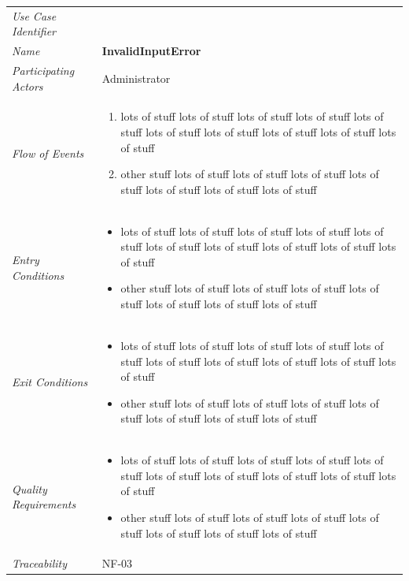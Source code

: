 \documentclass[12pt,letterpaper]{article}
\begin{document}
\begin{center}
	\begin{tabu} to 
		\toprule
		Use Case Identifier & \invalidinputerror{} \\
		Name & {\bf InvalidInputError} \\
		Participating Actors & Administrator \\
		Flow of Events & 
	    \begin{enumerate}[topsep=-1em]
		    \item lots of stuff lots of stuff lots of stuff lots of stuff lots of stuff lots of stuff lots of stuff lots of stuff lots of stuff lots of stuff
		    \item other stuff lots of stuff lots of stuff lots of stuff lots of stuff lots of stuff lots of stuff lots of stuff
		\end{enumerate} \\

		Entry Conditions &
		\begin{itemize}[topsep=-1em]
		    \item lots of stuff lots of stuff lots of stuff lots of stuff lots of stuff lots of stuff lots of stuff lots of stuff lots of stuff lots of stuff
		    \item other stuff lots of stuff lots of stuff lots of stuff lots of stuff lots of stuff lots of stuff lots of stuff
        \end{itemize} \\

		Exit Conditions &
		\begin{itemize}[topsep=-1em]
		    \item lots of stuff lots of stuff lots of stuff lots of stuff lots of stuff lots of stuff lots of stuff lots of stuff lots of stuff lots of stuff
		    \item other stuff lots of stuff lots of stuff lots of stuff lots of stuff lots of stuff lots of stuff lots of stuff
        \end{itemize} \\

		Quality Requirements &
		\begin{itemize}[topsep=-1em]
		    \item lots of stuff lots of stuff lots of stuff lots of stuff lots of stuff lots of stuff lots of stuff lots of stuff lots of stuff lots of stuff
		    \item other stuff lots of stuff lots of stuff lots of stuff lots of stuff lots of stuff lots of stuff lots of stuff
        \end{itemize} \\

		Traceability & NF-03 \\
		\toprule
	\end{tabu}
\end{center}
\end{document}
